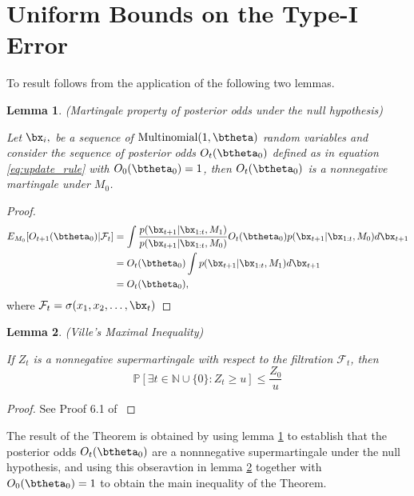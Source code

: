 \documentclass[11pt]{article}
\newtheorem{lemma}{Lemma}[section]
\begin{document}
\section{Uniform Bounds on the Type-I Error}
\label{app:type_1_error}
To result follows from the application of the following two lemmas.
\begin{lemma}(Martingale property of posterior odds under the null hypothesis)
  
  \noindent Let $\bx_i,$ be a sequence of $\text{Multinomial}(1,\btheta)$ random variables and consider the sequence of posterior odds $O_t(\btheta_0)$ defined as in equation \eqref{eq:update_rule} with $O_0(\btheta_0)=1$, then $O_t(\btheta_0)$ is a nonnegative martingale under $M_0$.
  \label{lem:posterior_odds_martingale}
    \end{lemma}
  \begin{proof}
  \begin{align*}
    E_{M_0}[O_{t+1}(\btheta_0)|\mathcal{F}_t]  &= \int \frac{p(\bx_{t+1}|\bx_{1:t},M_1)}{p(\bx_{t+1}|\bx_{1:t},M_0)} O_{t}(\btheta_0) p(\bx_{t+1}|\bx_{1:t},M_0) d\bx_{t+1}\\
    &=  O_{t}(\btheta_0) \int p(\bx_{t+1}|\bx_{1:t},M_1) d\bx_{t+1}\\
    &=  O_{t}(\btheta_0),
  \end{align*}
  where $\mathcal{F}_{t} = \sigma(x_1,x_2,\dots, \bx_t)$
\end{proof}

\begin{lemma}(Ville's Maximal Inequality)
  
\label{lem:durrett}
  \noindent If $Z_{t}$ is a nonnegative supermartingale with respect to the filtration $\mathcal{F}_t$, then
  \begin{equation}
    \label{eq:durrett}
    \mathbb{P}[\exists t \in \mathbb{N}\cup \lbrace 0 \rbrace : Z_t \geq u] \leq \frac{Z_0}{u}
  \end{equation}
\end{lemma}
\begin{proof}
  See Proof 6.1 of \cite{howard}
\end{proof}
The result of the Theorem is obtained by using lemma \ref{lem:posterior_odds_martingale} to establish that the posterior odds $O_t(\btheta_0)$ are a nonnnegative supermartingale under the null hypothesis, and using this obseravtion in lemma \ref{lem:durrett} together with  $O_0(\btheta_0) = 1$  to obtain the main inequality of the Theorem.
\end{document}
